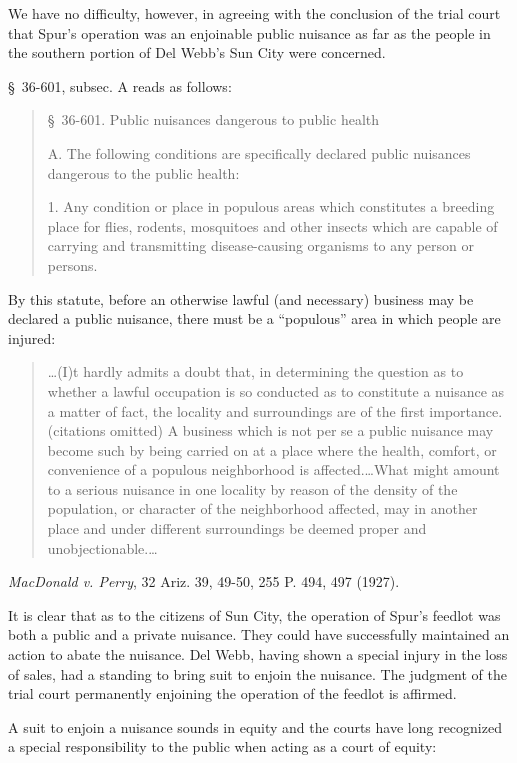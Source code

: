 We have no difficulty, however, in agreeing with the conclusion of the trial
court that Spur's operation was an enjoinable public nuisance as far as the
people in the southern portion of Del Webb's Sun City were concerned.

\S~36-601, subsec. A reads as follows:
\begin{quotation}
\S~36-601. Public nuisances dangerous to public health

A. The following conditions are specifically declared public nuisances
dangerous to the public health:

1. Any condition or place in populous areas which constitutes a breeding
place for flies, rodents, mosquitoes and other insects which are capable of
carrying and transmitting disease-causing organisms to any person or persons.
\end{quotation}
By this statute, before an otherwise lawful (and necessary) business may be
declared a public nuisance, there must be a ``populous'' area in which people
are injured:
\begin{quote}
\ldots (I)t hardly admits a doubt that, in determining the question as to
whether a lawful occupation is so conducted as to constitute a nuisance as a
matter of fact, the locality and surroundings are of the first importance.
(citations omitted) A business which is not per se a public nuisance may become
such by being carried on at a place where the health, comfort, or convenience of
a populous neighborhood is affected.\ldots What might amount to a serious
nuisance in one locality by reason of the density of the population, or
character of the neighborhood affected, may in another place and under different
surroundings be deemed proper and unobjectionable.\ldots
\end{quote}
\emph{MacDonald v. Perry}, 32 Ariz. 39, 49-50, 255 P. 494, 497 (1927).

It is clear that as to the citizens of Sun City, the operation of Spur's feedlot
was both a public and a private nuisance. They could have successfully
maintained an action to abate the nuisance. Del Webb, having shown a special
injury in the loss of sales, had a standing to bring suit to enjoin the
nuisance. The judgment of the trial court permanently enjoining the operation of
the feedlot is affirmed.


A suit to enjoin a nuisance sounds in equity and the courts have long recognized
a special responsibility to the public when acting as a court of equity:

